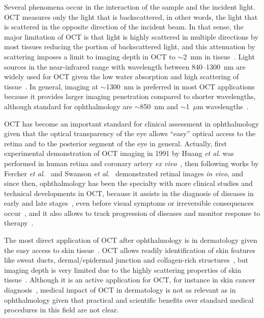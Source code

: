 Several phenomena occur in the interaction of the sample and the incident light. OCT measures only the light that is backscattered, in other words, the light that is scattered in the opposite direction of the incident beam. In that sense, the major limitation of OCT is that light is highly scattered in multiple directions by most tissues reducing the portion of backscattered light, and this attenuation by scattering imposes a limit to imaging depth in OCT to $\sim$2~mm in tissue~\cite{Fujimoto2015_Introduction}. Light sources in the near-infrared range with wavelength between 840--1300~nm are widely used for OCT given the low water absorption and high scattering of tissue~\cite{Schmitt1994_Opticalcoherence}. In general, imaging at $\sim$1300~nm is preferred in most OCT applications because it provides larger imaging penetration compared to shorter wavelengths, although standard for ophthalmology are $\sim$850~nm and $\sim$1~$\mu$m wavelengths~\cite{Fujimoto2015_Introduction}.

OCT has become an important standard for clinical assessment in ophthalmology given that the optical transparency of the eye allows ``easy'' optical access to the retina and to the posterior segment of the eye in general. Actually, first experimental demonstration of OCT imaging in 1991 by Huang \textit{et al}. was performed in human retina and coronary artery \textit{ex vivo}~\cite{Huang1991_Optical}, then following works by Fercher \textit{et al}.~\cite{Fercher1993_Vivo} and Swanson \textit{et al}.~\cite{Swanson1993_Vivo-1} demonstrated retinal images \textit{in vivo}, and since then, ophthalmology has been the specialty with more clinical studies and technical developments in OCT, because it assists in the diagnosis of diseases in early and late stages~\cite{Puliafito1995_Imaging, Chu2007_Clinical, Sathyan2012_Optical}, even before visual symptoms or irreversible consequences occur~\cite{Schuman1995_Quantification}, and it also allows to track progression of diseases and monitor response to therapy~\cite{Carrasco-Zevallos2017_Review, Chang2018_Intelligent, Maltais-Tariant2020_Realtime}.

The most direct application of OCT after ophthalmology is in dermatology given the easy access to skin tissue~\cite{Welzel2001_Optical}. OCT allows readily identification of skin features like sweat ducts, dermal/epidermal junction and collagen-rich structures~\cite{Welzel1997_Optical}, but imaging depth is very limited due to the highly scattering properties of skin tissue~\cite{Carrion2007_Comparative}. Although it is an active application for OCT, for instance in skin cancer diagnosis~\cite{FerrantediRuffano2018_Optical}, medical impact of OCT in dermatology is not as relevant as in ophthalmology given that practical and scientific benefits over standard medical procedures in this field are not clear.

